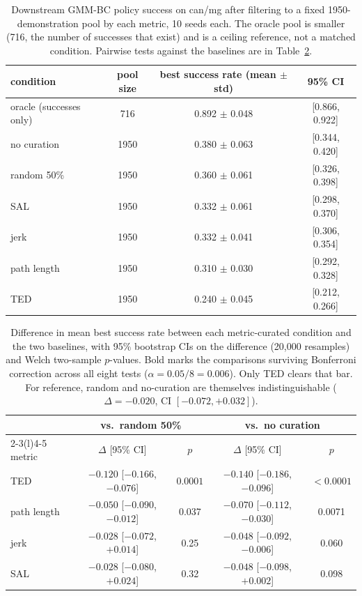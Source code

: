 \documentclass{article}
\begin{document}
\begin{table}[t]
\centering
\small
\begin{tabular}{lccc}
\toprule
condition & pool size & best success rate (mean $\pm$ std) & 95\% CI \\
\midrule
oracle (successes only) & 716 & 0.892 $\pm$ 0.048 & [0.866, 0.922] \\
\midrule
no curation             & 1950 & 0.380 $\pm$ 0.063 & [0.344, 0.420] \\
random 50\%             & 1950 & 0.360 $\pm$ 0.061 & [0.326, 0.398] \\
\midrule
SAL                     & 1950 & 0.332 $\pm$ 0.061 & [0.298, 0.370] \\
jerk                    & 1950 & 0.332 $\pm$ 0.041 & [0.306, 0.354] \\
path length             & 1950 & 0.310 $\pm$ 0.030 & [0.292, 0.328] \\
TED                     & 1950 & 0.240 $\pm$ 0.045 & [0.212, 0.266] \\
\bottomrule
\end{tabular}
\caption{Downstream GMM-BC policy success on can/mg after filtering to a
fixed 1950-demonstration pool by each metric, 10 seeds each. The oracle pool
is smaller (716, the number of successes that exist) and is a ceiling
reference, not a matched condition. Pairwise tests against the baselines are
in Table~\ref{tab:tests}.}
\label{tab:training}
\end{table}

\begin{table}[t]
\centering
\small
\begin{tabular}{lcccc}
\toprule
& \multicolumn{2}{c}{vs.\ random 50\%} & \multicolumn{2}{c}{vs.\ no curation} \\
\cmidrule(lr){2-3}\cmidrule(l){4-5}
metric & $\Delta$ [95\% CI] & $p$ & $\Delta$ [95\% CI] & $p$ \\
\midrule
TED         & $-0.120$ [$-0.166$, $-0.076$] & $\mathbf{0.0001}$ & $-0.140$ [$-0.186$, $-0.096$] & $\mathbf{<0.0001}$ \\
path length & $-0.050$ [$-0.090$, $-0.012$] & 0.037 & $-0.070$ [$-0.112$, $-0.030$] & 0.0071 \\
jerk        & $-0.028$ [$-0.072$, $+0.014$] & 0.25 & $-0.048$ [$-0.092$, $-0.006$] & 0.060 \\
SAL         & $-0.028$ [$-0.080$, $+0.024$] & 0.32 & $-0.048$ [$-0.098$, $+0.002$] & 0.098 \\
\bottomrule
\end{tabular}
\caption{Difference in mean best success rate between each metric-curated
condition and the two baselines, with 95\% bootstrap CIs on the difference
(20{,}000 resamples) and Welch two-sample $p$-values. Bold marks the
comparisons surviving Bonferroni correction across all eight tests
($\alpha = 0.05/8 = 0.006$). Only TED clears that bar. For reference,
random and no-curation are themselves indistinguishable
($\Delta = -0.020$, CI $[-0.072, +0.032]$).}
\label{tab:tests}
\end{table}
\end{document}
